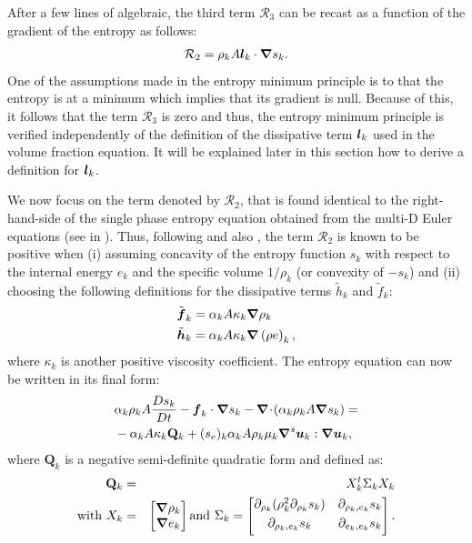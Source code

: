 After a few lines of algebraic, the third term ${\mathcal{R}_3}$ can be recast as a function of the gradient of the entropy as follows:
\begin{align}
 \label{eq:ent-R3-sct4}
  \mathcal{R}_2  =  \rho_k A \boldsymbol l_k \cdot \boldsymbol{\nabla} s_k.
\end{align} 
One of the assumptions made in the entropy minimum principle is to that the entropy 
is at a minimum which implies that its gradient is null. Because of this, it follows that
the term $\mathcal{R}_3$ is zero and thus, the entropy minimum principle is verified
independently of the definition of the dissipative term $\boldsymbol l_k$ used in the volume fraction
equation. It will be explained later in this section how to derive a definition for $\boldsymbol l_k$.

We now focus on the term denoted by $\mathcal{R}_2$, that is found identical to the right-hand-side of the single phase entropy equation obtained from the multi-D Euler equations (see  in ). Thus, following \cite{jlg} and also , the term $\mathcal{R}_2$ is known to be positive when (i) assuming concavity of the entropy function $s_k$ with respect to the internal energy $e_k$ and the specific volume $1 / \rho_k$ (or convexity of $-s_k$) and (ii) choosing the following definitions for the dissipative terms $\tilde{h}_k$ and $\tilde{f}_k$:
%
\begin{align}
&\tilde{\boldsymbol f}_k = \alpha_k A \kappa_k \boldsymbol{\nabla} \rho_k \\
&\tilde{\boldsymbol h}_k = \alpha_k A \kappa_k \boldsymbol{\nabla} \left( \rho e \right)_k,
\end{align}
%  
where $\kappa_k$ is another positive viscosity coefficient. The entropy equation can now be written in its final form:
%
\begin{align}\label{eq:ent-res-7-eqn-diss-terms3}
&\alpha_k \rho_k A \frac{Ds_k}{Dt} - \boldsymbol f_k \cdot \boldsymbol{\nabla} s_k - \boldsymbol{\nabla}\! \cdot \! \left( \alpha_k \rho_k A \boldsymbol{\nabla} s_k \right) = \nonumber\\
&- \alpha_k A \kappa_k \mathbf{Q}_k + (s_e)_k \alpha_k A \rho_k \mu_k \boldsymbol{\nabla}^s \boldsymbol u_k : \boldsymbol{\nabla} \boldsymbol u_k,
\end{align}
%
where $\mathbf{Q}_k$ is a negative semi-definite quadratic form and defined as:
%
\begin{eqnarray}
\mathbf{Q}_k &=& X^t_k \Sigma_k X_k \nonumber \\
\text{with } X_k &=& \begin{bmatrix}
\boldsymbol{\nabla} \rho_k \\
\boldsymbol{\nabla} e_k 
\end{bmatrix}
\text{and } \Sigma_k = \begin{bmatrix}
       \partial_{\rho_k} (\rho^2_k \partial_{\rho_k} s_k) & \partial_{\rho_k,e_k} s_k  \\[0.3em]
       \partial_{\rho_k,e_k} s_k & \partial_{e_k,e_k} s_k           \\[0.3em]
     \end{bmatrix}. \nonumber 
\end{eqnarray}
